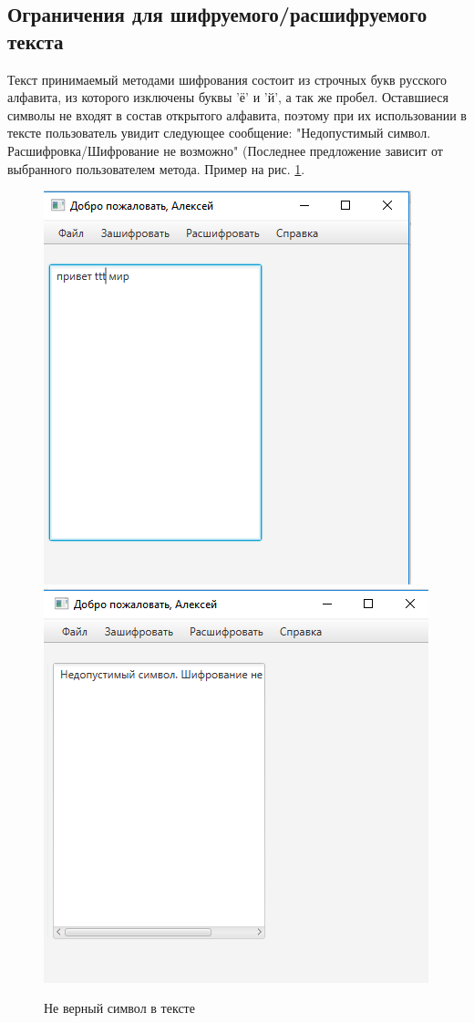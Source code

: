 \documentclass[a4paper,12pt]{article}
\begin{document}
\subsection{Ограничения для шифруемого/расшифруемого текста}
Текст принимаемый методами шифрования состоит из строчных букв русского алфавита, из которого изключены буквы 'ё' и 'й', а так же пробел. Оставшиеся символы не входят в состав открытого алфавита, поэтому при их использовании в тексте пользователь увидит следующее сообщение: "Недопустимый символ. Расшифровка/Шифрование не возможно" (Последнее предложение зависит от выбранного пользователем метода. Пример на рис. \ref{fig:wrong_char_and_response}.
\begin{center}
	\begin{figure}[h!]
		\centering
		\includegraphics[scale=0.7]{img/wrong_char.png}
		\includegraphics[scale=0.7]{img/wrong_char_response.png}
		\caption{Не верный символ в тексте}
		\label{fig:wrong_char_and_response}
	\end{figure}
\end{center}
\end{document}
